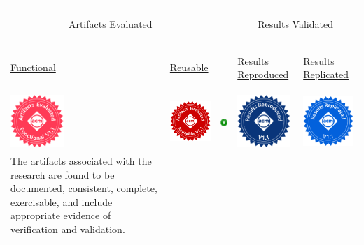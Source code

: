\documentclass[twoside,a4paper]{refart}
\newcommand{\evaluated}{\protect\hyperlink{evaluated}{Artifacts Evaluated}\xspace}
\newcommand{\functional}{\protect\hyperlink{functional}{Functional}\xspace}
\newcommand{\reusable}{\protect\hyperlink{reusable}{Reusable}\xspace}
\newcommand{\available}{\protect\hyperlink{available}{Artifacts Available}\xspace}
\newcommand{\validated}{\protect\hyperlink{validated}{Results Validated}\xspace}
\newcommand{\reproduced}{\protect\hyperlink{reproduced}{Results Reproduced}\xspace}
\newcommand{\replicated}{\protect\hyperlink{replicated}{Results Replicated}\xspace}
\newcommand{\documented}{\protect\hyperlink{documented}{documented}\xspace}
\newcommand{\consistent}{\protect\hyperlink{consistent}{consistent}\xspace}
\newcommand{\complete}{\protect\hyperlink{complete}{complete}\xspace}
\newcommand{\exercisable}{\protect\hyperlink{exercisable}{exercisable}\xspace}
\begin{document}
\begin{tabularx}{0.9\paperwidth}{XXXXX}
  \multicolumn{2}{c}{\hypertarget{evaluated}{\evaluated}}
  & \centering \raisebox{0pt}{\hypertarget{available}{\available}}
  & \multicolumn{2}{c}{\hypertarget{validated}{\validated}}
  \arraybackslash \\
  \centering \hypertarget{functional}{\functional}
  &
  \centering \hypertarget{reusable}{\reusable}
  & 
  & \centering \hypertarget{reproduced}{\reproduced}
  & \centering \hypertarget{replicated}{\replicated} \arraybackslash
  \\ [2em]

  \centering
  \includegraphics[width=2cm]{artifacts_evaluated_functional_v1_1.png}
  &
  \centering
  \includegraphics[width=2cm]{artifacts_evaluated_reusable_v1_1.png}
  &
  \centering
  \includegraphics[width=2cm]{artifacts_available_v1_1.png}
  &
  \centering
  \includegraphics[width=2cm]{results_reproduced_v1_1.png}  
  &
  \centering
  \includegraphics[width=2cm]{results_replicated_v1_1.png}
  \arraybackslash
  \\[2em]

  \raggedright The artifacts associated with the research are found to
  be \documented, \consistent, \complete, \exercisable, and include
  appropriate evidence of verification and validation.
  

\end{tabularx}
\end{document}
